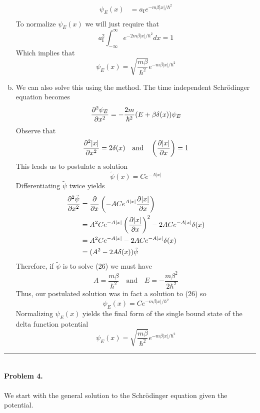 \documentclass[]{book}
\begin{document}
\begin{enumerate}[(a)]
\begin{equation}
\begin{split}
\psi_E(x) &= a_\textrm{I}e^{-m\beta|x|/\hbar^2} \\
\end{split}
\end{equation}
To normalize $\psi_E(x)$ we will just require that
$$a_\textrm{I}^2\int_{-\infty}^{\infty}e^{-2m\beta|x|/\hbar^2}dx = 1$$
Which implies that
$$\psi_E(x) = \sqrt{\frac{m\beta}{\hbar^2}}e^{-m\beta|x|/\hbar^2}$$
\item We can also solve this using the  method. The time independent Schr{\"o}dinger equation becomes
\begin{equation}
\pdv[2]{\psi_E}{x} = -\frac{2m}{\hbar^2}(E+\beta\delta(x))\psi_E
\end{equation}
Observe that
\begin{equation}
\pdv[2]{|x|}{x}=2\delta(x) \quad \textrm{and} \quad \left(\pdv{|x|}{x}\right)=1
\end{equation}
This leads us to postulate a solution
\begin{equation}
\tilde{\psi}(x)=Ce^{-A|x|}
\end{equation}
Differentiating $\tilde{\psi}$ twice yields
\begin{equation}
\begin{split}
\pdv[2]{\tilde{\psi}}{x} &= \pdv{x}\left(-ACe^{A|x|}\pdv{|x|}{x} \right)\\
&= A^2Ce^{-A|x|}\left(\pdv{|x|}{x}\right)^2 - 2ACe^{-A|x|}\delta(x) \\
&= A^2Ce^{-A|x|} - 2ACe^{-A|x|}\delta(x) \\
&= (A^2- 2A\delta(x))\tilde{\psi}
\end{split}
\end{equation}
Therefore, if $\tilde{\psi}$ is to solve (26) we must have
\begin{equation}
A = \frac{m\beta}{\hbar^2} \quad \textrm{and} \quad E=-\frac{m\beta^2}{2\hbar^2}
\end{equation}
Thus, our postulated solution was in fact a solution to (26) so 
$$\psi_E(x)=Ce^{-m\beta|x|/\hbar^2}$$
Normalizing $\psi_E(x)$ yields the final form of the single bound state of the delta function potential
\begin{equation}
\psi_E(x) = \sqrt{\frac{m\beta}{\hbar^2}}e^{-m\beta|x|/\hbar^2}
\end{equation}
\end{enumerate}
\noindent\rule{15cm}{0.4pt} \\
{\bf Problem 4.} \\ \\
We start with the general solution to the Schr{\"o}dinger equation given the potential.
\end{document}
